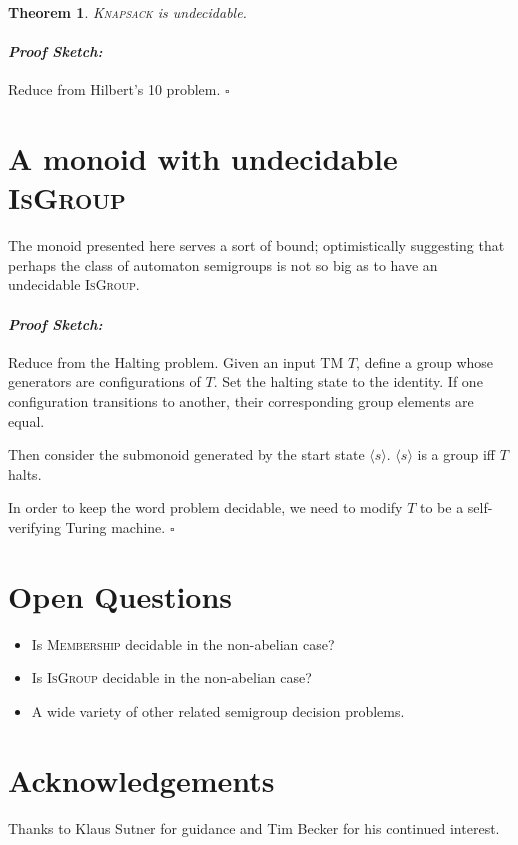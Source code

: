 \documentclass[a0]{a0poster}
\newcommand{\decprob}[1]{\textsc{#1}}
\theoremstyle{pleasant}
\newtheorem{theorem}{Theorem}
\newenvironment{proofsketch}{\paragraph{\large \normalfont \textit{Proof Sketch:}}}{\hfill$\square$}
\newcommand{\0}{\underline{0}}
\newcommand{\1}{\underline{1}}
\newcommand{\2}{\underline{2}}
\begin{document}
\begin{multicols}{3}
\begin{theorem}
  \textsc{Knapsack} is undecidable.
\end{theorem}

\begin{proofsketch}
  Reduce from Hilbert's 10 problem.
\end{proofsketch}


\section*{A monoid with undecidable \textsc{IsGroup}}

The monoid presented here serves a sort of bound; optimistically
suggesting that perhaps the class of automaton semigroups is not so
big as to have an undecidable \decprob{IsGroup}.

\begin{proofsketch}
  Reduce from the Halting problem. Given an input TM $T$, define a
  group whose generators are configurations of $T$. Set the halting
  state to the identity. If one configuration transitions to another,
  their corresponding group elements are equal.

  Then consider the submonoid generated by the start state
  $\langle s \rangle$. $\langle s \rangle$ is a group iff $T$ halts.

  In order to keep the word problem decidable, we need to modify $T$
  to be a self-verifying Turing machine.
\end{proofsketch}

\section*{Open Questions}

\begin{itemize}
\item Is \textsc{Membership} decidable in the non-abelian case?
\item Is \textsc{IsGroup} decidable in the non-abelian case?
\item A wide variety of other related semigroup decision problems.
\end{itemize}

\section*{Acknowledgements}

Thanks to Klaus Sutner for guidance and Tim Becker for his continued interest.

\end{multicols}
\end{document}
